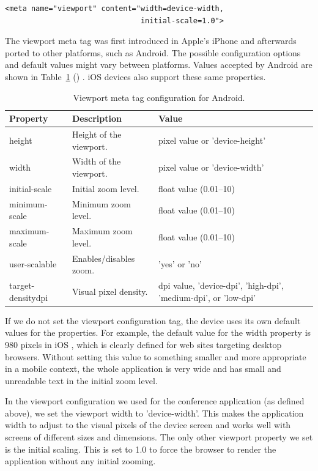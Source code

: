 \begin{verbatim}
<meta name="viewport" content="width=device-width,
                               initial-scale=1.0">
\end{verbatim}

The viewport meta tag was first introduced in Apple's iPhone and
afterwards ported to other platforms, such as Android. The possible
configuration options and default values might vary between
platforms. Values accepted by Android are shown in
Table~\ref{table:viewport-meta} ()
\citationneeded. iOS devices also support these same properties.

\begin{table}
  \begin{tabular}{ l | l | p{5cm} }
    \textbf{Property} & \textbf{Description} & \textbf{Value} \\ \hline
    height & Height of the viewport. & pixel value or 'device-height' \\
    width & Width of the viewport. & pixel value or 'device-width' \\
    initial-scale & Initial zoom level. & float value (0.01--10) \\
    minimum-scale & Minimum zoom level. & float value (0.01--10) \\
    maximum-scale & Maximum zoom level. & float value (0.01--10) \\
    user-scalable & Enables/disables zoom. & 'yes' or 'no' \\
    target-densitydpi & Visual pixel density. & dpi value, 'device-dpi', 'high-dpi', 'medium-dpi', or 'low-dpi' \\
  \end{tabular}
  \label{table:viewport-meta}
  \caption{Viewport meta tag configuration for Android.}
\end{table}

If we do not set the viewport configuration tag, the device uses its
own default values for the properties. For example, the default value
for the width property is 980 pixels in iOS \citationneeded, which is
clearly defined for web sites targeting desktop browsers. Without
setting this value to something smaller and more appropriate in a
mobile context, the whole application is very wide and has small and
unreadable text in the initial zoom level.

In the viewport configuration we used for the conference application
(as defined above), we set the viewport width to 'device-width'. This
makes the application width to adjust to the visual pixels of the
device screen and works well with screens of different sizes and
dimensions. The only other viewport property we set is the initial
scaling. This is set to 1.0 to force the browser to render the
application without any initial zooming.


